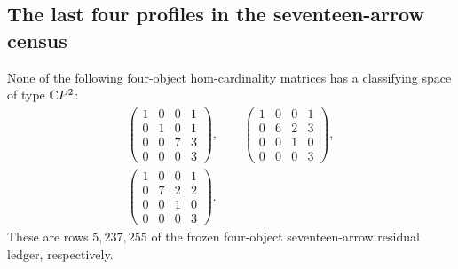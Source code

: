 \subsection{The last four profiles in the seventeen-arrow census}

\begin{proposition}
\label{CP2:A-four17-final-pendant}
None of the following four-object hom-cardinality matrices
has a classifying space of type $\mathbb{C}P^2$:
\[
\begin{gathered}
\begin{pmatrix}1&0&0&1\\0&1&0&1\\0&0&7&3\\0&0&0&3\end{pmatrix},\qquad
\begin{pmatrix}1&0&0&1\\0&6&2&3\\0&0&1&0\\0&0&0&3\end{pmatrix},\\
\begin{pmatrix}1&0&0&1\\0&7&2&2\\0&0&1&0\\0&0&0&3\end{pmatrix}.
\end{gathered}
\]
These are rows $5,237,255$ of the frozen four-object
seventeen-arrow residual ledger, respectively.
\end{proposition}
